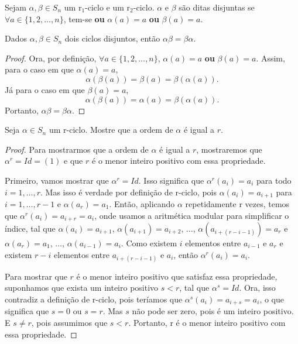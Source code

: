 \documentclass[11pt,openany]{book}
\begin{document}
\begin{definition}
\label{def:permutacaoes_disjuntas}
    Sejam $\alpha, \beta \in S_n$ um r$_1$-ciclo e um r$_2$-ciclo. $\alpha$ e $\beta$ são ditas disjuntas se $\forall a \in \{1,2,\dots,n\}$, tem-se \textbf{ou} $\alpha(a) = a$ \textbf{ou} $\beta(a) = a$.
\end{definition}

\begin{proposition}
\label{prop:permutacoes_disjuntas_comutacao}
Dados $\alpha, \beta \in S_n$ dois ciclos disjuntos, então $\alpha \beta = \beta \alpha$.
\end{proposition}

\begin{proof}
    Ora, por definição, $\forall a \in \{1,2,\dots,n\}$, $\alpha(a) = a$ \textbf{ou} $\beta(a) = a$. Assim, para o caso em que $\alpha(a) = a$,
    \[\alpha(\beta(a)) = \beta(a) = \beta(\alpha(a)).\]
    Já para o caso em que $\beta(a) = a$,
    \[\alpha(\beta(a)) = \alpha(a) = \beta(\alpha(a)).\]
    Portanto, $\alpha \beta = \beta \alpha$.
\end{proof}

\begin{proposition}
\label{prop:ordem_r_ciclo}
    Seja $\alpha \in S_n$ um r-ciclo. Mostre que a ordem de $\alpha$ é igual a $r$.
\end{proposition}

\begin{proof}
    Para mostrarmos que a ordem de $\alpha$ é igual a $r$, mostraremos que $\alpha^r = Id = (1)$ e que $r$ é o menor inteiro positivo com essa propriedade.
    
    Primeiro, vamos mostrar que $\alpha^r = Id$. Isso significa que $\alpha^r(a_i) = a_i$ para todo $i = 1, \dots, r$. Mas isso é verdade por definição de r-ciclo, pois $\alpha(a_i) = a_{i+1}$ para $i = 1, \dots, r-1$ e $\alpha(a_r) = a_1$. Então, aplicando $\alpha$ repetidamente r vezes, temos que $\alpha^r(a_i) = a_{i+r} = a_i$, onde usamos a aritmética modular para simplificar o índice, tal que $\alpha(a_i) = a_{i+1}$, $\alpha(a_{i+1}) = a_{i+2}$, $\dots$, $\alpha(a_{i+(r-i-1)}) = a_{r}$ e $\alpha(a_r) = a_{1}$, $\dots$, $\alpha(a_{i-1}) = a_{i}$. Como existem $i$ elementos entre $a_{i-1}$ e $a_r$ e existem $r-i$ elementos entre $a_{i+(r-i-1)}$ e $a_i$, então $\alpha^r(a_i) = a_i$.

    Para mostrar que $r$ é o menor inteiro positivo que satisfaz essa propriedade, suponhamos que exista um inteiro positivo $s < r$, tal que $\alpha^s = Id$. Ora, isso contradiz a definição de r-ciclo, pois teríamos que $\alpha^s(a_i) = a_{i+s} = a_i$, o que significa que $s = 0$ ou $s = r$. Mas $s$ não pode ser zero, pois é um inteiro positivo. E $s \not= r$, pois assumimos que $s < r$. Portanto, r é o menor inteiro positivo com essa propriedade.
\end{proof}
\end{document}
